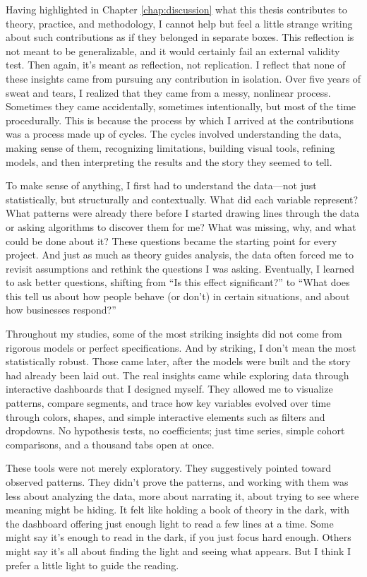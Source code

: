 Having highlighted in Chapter \ref{chap:discussion} what this thesis contributes to theory, practice, and methodology, I cannot help but feel a little strange writing about such contributions as if they belonged in separate boxes. This reflection is not meant to be generalizable, and it would certainly fail an external validity test. Then again, it’s meant as reflection, not replication. I reflect that none of these insights came from pursuing any contribution in isolation. Over five years of sweat and tears, I realized that they came from a messy, nonlinear process. Sometimes they came accidentally, sometimes intentionally, but most of the time procedurally. This is because the process by which I arrived at the contributions was a process made up of cycles. The cycles involved understanding the data, making sense of them, recognizing limitations, building visual tools, refining models, and then interpreting the results and the story they seemed to tell.

To make sense of anything, I first had to understand the data—not just statistically, but structurally and contextually. What did each variable represent? What patterns were already there before I started drawing lines through the data or asking algorithms to discover them for me? What was missing, why, and what could be done about it? These questions became the starting point for every project. And just as much as theory guides analysis, the data often forced me to revisit assumptions and rethink the questions I was asking. Eventually, I learned to ask better questions, shifting from “Is this effect significant?” to “What does this tell us about how people behave (or don’t) in certain situations, and about how businesses respond?”

Throughout my studies, some of the most striking insights did not come from rigorous models or perfect specifications. And by striking, I don’t mean the most statistically robust. Those came later, after the models were built and the story had already been laid out. The real insights came while exploring data through interactive dashboards that I designed myself. They allowed me to visualize patterns, compare segments, and trace how key variables evolved over time through colors, shapes, and simple interactive elements such as filters and dropdowns. No hypothesis tests, no coefficients; just time series, simple cohort comparisons, and a thousand tabs open at once. 

These tools were not merely exploratory. They suggestively pointed toward observed patterns. They didn’t prove the patterns, and working with them was less about analyzing the data, more about narrating it, about trying to see where meaning might be hiding. It felt like holding a book of theory in the dark, with the dashboard offering just enough light to read a few lines at a time. Some might say it’s enough to read in the dark, if you just focus hard enough. Others might say it’s all about finding the light and seeing what appears. But I think I prefer a little light to guide the reading.

